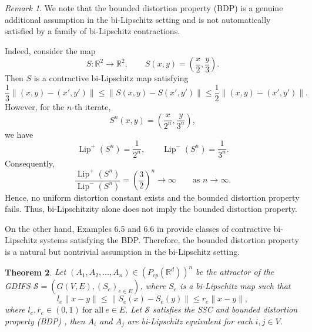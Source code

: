 \documentclass[a4paper,12pt,reqno]{amsart}
\numberwithin{equation}{section}
\newtheorem{theorem}{Theorem}[section]
\theoremstyle{definition}
\theoremstyle{remark}
\newtheorem{remark}[theorem]{Remark}
\numberwithin{equation}{section}
\begin{document}
\begin{remark}
We note that the bounded distortion property (BDP) is a genuine additional assumption in the bi-Lipschitz setting and is not automatically satisfied by a family of bi-Lipschitz contractions.

Indeed, consider the map
\[
S:\mathbb{R}^{2}\to\mathbb{R}^{2},
\qquad
S(x,y)=\left(\frac{x}{2},\frac{y}{3}\right).
\]
Then \(S\) is a contractive bi-Lipschitz map satisfying
\[
\frac{1}{3}\|(x,y)-(x',y')\|
\le
\|S(x,y)-S(x',y')\|
\le
\frac{1}{2}\|(x,y)-(x',y')\|.
\]
However, for the \(n\)-th iterate,
\[
S^{n}(x,y)
=
\left(
\frac{x}{2^{n}},
\frac{y}{3^{n}}
\right),
\]
we have
\[
\operatorname{Lip}^{+}(S^{n})=\frac{1}{2^{n}},
\qquad
\operatorname{Lip}^{-}(S^{n})=\frac{1}{3^{n}}.
\]
Consequently,
\[
\frac{\operatorname{Lip}^{+}(S^{n})}
{\operatorname{Lip}^{-}(S^{n})}
=
\left(\frac{3}{2}\right)^{n}
\to\infty
\qquad
\text{as } n\to\infty.
\]
Hence, no uniform distortion constant exists and the bounded distortion property fails. Thus, bi-Lipschitzity alone does not imply the bounded distortion property.

On the other hand, Examples 6.5 and 6.6 in \cite{NG} provide classes of contractive bi-Lipschitz systems satisfying the BDP. Therefore, the bounded distortion property is a natural but nontrivial assumption in the bi-Lipschitz setting.
\end{remark}
\begin{theorem}
 Let $(A_1,A_2,\dots,A_n)\in (P_{cp}(\mathbb{R}^d))^n$ be the attractor of the GDIFS
$\mathcal S=(G(V,E),(S_e)_{e\in E})$, where $S_e$ is a bi-Lipschitz map such that
$$l_{e}\|x-y\|\leq \|S_e(x)-S_{e}(y)\|\leq r_{e}\|x-y\|,$$ where $l_e,r_e\in (0,1)~\text{for all}~e\in E.$ 
    Let $\mathcal{S}$ satisfies the SSC and bounded distortion property (BDP) , then $A_i$ and $A_j$ are bi-Lipschitz equivalent for each $i,j\in V.$
\end{theorem}
\end{document}
